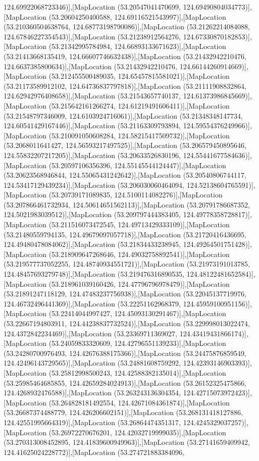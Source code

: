 124.69922068723346)],[MapLocation (53.20547041470699, 124.69490804034773)],[MapLocation (53.20604250400588, 124.69116521543997)],[MapLocation (53.210360504638764, 124.68773198790086)],[MapLocation (53.21262214084088, 124.67846227354543)],[MapLocation (53.21238912564276, 124.67330870182853)],[MapLocation (53.21342995784984, 124.66893133671623)],[MapLocation (53.21413668135419, 124.66607746632438)],[MapLocation (53.21432942210476, 124.6637385800634)],[MapLocation (53.21432942210476, 124.66144260914669)],[MapLocation (53.212455500489035, 124.65457815581021)],[MapLocation (53.21173589912102, 124.64736837797818)],[MapLocation (53.21111908832864, 124.62942976408658)],[MapLocation (53.21543657740137, 124.61373986845669)],[MapLocation (53.215642161266274, 124.61219491606411)],[MapLocation (53.21548797346009, 124.6103924716061)],[MapLocation (53.21348348147734, 124.60541429167446)],[MapLocation (53.21163309793894, 124.59554376249966)],[MapLocation (53.210091050608284, 124.58215417509732)],[MapLocation (53.2068011641427, 124.56593217497525)],[MapLocation (53.206579450895646, 124.55832207217205)],[MapLocation (53.20633526830196, 124.55441677584636)],[MapLocation (53.20597106356396, 124.55145544124447)],[MapLocation (53.20623568946844, 124.55065431242642)],[MapLocation (53.20540806744117, 124.53417129439234)],[MapLocation (53.206030060464094, 124.52138604765591)],[MapLocation (53.20739171089835, 124.5100114082276)],[MapLocation (53.207866461732934, 124.50614651562113)],[MapLocation (53.20791786687352, 124.5021983039512)],[MapLocation (53.209797444383405, 124.49778358728817)],[MapLocation (53.211516073472545, 124.49713429333109)],[MapLocation (53.21480559794135, 124.49679097057718)],[MapLocation (53.21720416436695, 124.49480478084062)],[MapLocation (53.21834433238945, 124.49264501751428)],[MapLocation (53.218909647268646, 124.49032758892541)],[MapLocation (53.219577737052255, 124.48740934551721)],[MapLocation (53.21973191013785, 124.48457693279748)],[MapLocation (53.219476316890535, 124.48122481652584)],[MapLocation (53.218961039160426, 124.47796796978479)],[MapLocation (53.21891247118129, 124.47483237756938)],[MapLocation (53.22045137719976, 124.46732496441369)],[MapLocation (53.22251162968379, 124.45959100951156)],[MapLocation (53.22414044997427, 124.45093130291467)],[MapLocation (53.22667194803911, 124.44238837732524)],[MapLocation (53.229998013022474, 124.4372842234469)],[MapLocation (53.23369711369027, 124.43419431866174)],[MapLocation (53.24059833320609, 124.42796551139233)],[MapLocation (53.24280700976493, 124.42676388175366)],[MapLocation (53.24475876859549, 124.42496143729565)],[MapLocation (53.24881608759292, 124.42393146903393)],[MapLocation (53.25812998500243, 124.42588382135014)],[MapLocation (53.25985464685855, 124.42659284024913)],[MapLocation (53.26152325475866, 124.4268932476588)],[MapLocation (53.263243136304354, 124.42715073972423)],[MapLocation (53.264828181492554, 124.42671084361874)],[MapLocation (53.26687374488779, 124.426206602151)],[MapLocation (53.268131418127886, 124.42551995664319)],[MapLocation (53.26864474351317, 124.4245329037257)],[MapLocation (53.26972270676201, 124.42032719999035)],[MapLocation (53.270313008452895, 124.41839600949963)],[MapLocation (53.27141659409942, 124.41625024228772)],[MapLocation (53.274721883384096, 